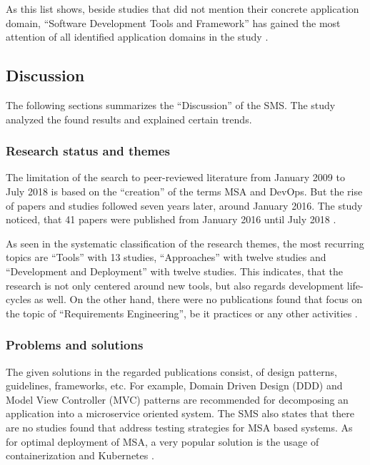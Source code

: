 As this list shows, beside studies that did not mention their concrete
application domain, ``Software Development Tools and Framework''
has gained the most attention of all identified application domains
in the study \cite{waseem:SMSMSADevOps}.

\subsection{Discussion}

The following sections summarizes the ``Discussion'' of the SMS. The study
analyzed the found results and explained certain trends.

\subsubsection{Research status and themes}

The limitation of the search to peer-reviewed literature from January 2009 to
July 2018 is based on the ``creation'' of the terms MSA and DevOps.
But the rise of papers and studies followed seven years later, around January 2016.
The study noticed, that 41 papers were published from January 2016 until July 2018
\cite{waseem:SMSMSADevOps}.

As seen in the systematic classification of the research themes, the most recurring
topics are ``Tools'' with 13 studies, ``Approaches'' with twelve studies and
``Development and Deployment'' with twelve studies. This indicates, that the research
is not only centered around new tools, but also regards development life-cycles
as well. On the other hand, there were no publications found that focus on
the topic of ``Requirements Engineering'', be it practices or any other
activities \cite{waseem:SMSMSADevOps}.

\subsubsection{Problems and solutions}

The given solutions in the regarded publications consist, of
design patterns, guidelines, frameworks, etc. For example,
Domain Driven Design (DDD) and Model View Controller (MVC) patterns
are recommended for decomposing an application into a microservice oriented
system. The SMS also states that there are no studies found that
address testing strategies for MSA based systems. As for optimal deployment
of MSA, a very popular solution is the usage of containerization and Kubernetes
\cite{waseem:SMSMSADevOps}.

